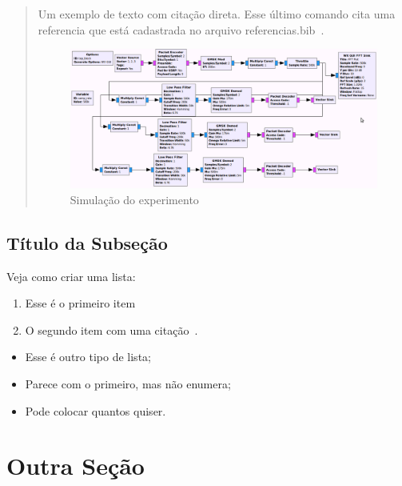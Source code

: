 \documentclass[journal]{IEEEtran}
\begin{document}
\lipsum[3-5] %


\begin{quotation}
Um exemplo de texto com citação direta. \lipsum[1-1]
Esse último comando cita uma referencia que está cadastrada no arquivo referencias.bib~\cite{mitola1999cognitive}. %

\begin{figure}[!th]
	\centering
	\includegraphics[width=\textwidth]{fluxo.png}
	\caption{Simulação do experimento}
\end{figure}


\end{quotation}

\subsection{Título da Subseção}
\lipsum[1]

Veja como criar uma lista:
\begin{enumerate}
    \item Esse é o primeiro item
    \item O segundo item com uma citação~\cite{akyildiz2006next}.
\end{enumerate}


\begin{itemize}
    \item Esse é outro tipo de lista;
    \item Parece com o primeiro, mas não enumera;
    \item Pode colocar quantos quiser.
\end{itemize}


\section{Outra Seção}
\lipsum[1-2]
\end{document}
